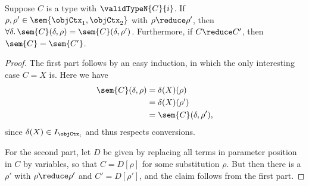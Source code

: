 \documentclass[preprint]{sigplanconf}
\begin{document}
\begin{lemma}
  \label{lem:interpret-resp-reduction}
  Suppose $C$ is a type with $\validTypeN{C}{i}$.
  If  $\rho, \rho' \in \sem{\objCtx_1,\objCtx_2}$ with
  $\rho \reduce \rho'$, then
  $\forall \delta. \,
  \sem{C}(\delta, \rho) = \sem{C}(\delta, \rho')$.
  Furthermore, if $C \reduce C'$, then $\sem{C} = \sem{C'}$.
\end{lemma}
\begin{proof}
  The first part follows by an easy induction, in which the only interesting
  case $C = X$ is.
  Here we have
  \begin{align*}
    \sem{C}(\delta, \rho)
    & = \delta(X)(\rho) \\
    & = \delta(X)(\rho') \\
    & = \sem{C}(\delta, \rho'),
  \end{align*}
  since $\delta(X) \in I_{\objCtx_i}$ and thus respects conversions.

  For the second part, let $D$ be given by replacing all terms in parameter
  position in $C$ by variables, so that $C = D[\rho]$ for some substitution
  $\rho$.
  But then there is a $\rho'$ with $\rho \reduce \rho'$ and $C' = D[\rho']$,
  and the claim follows from the first part.
\end{proof}
\end{document}
